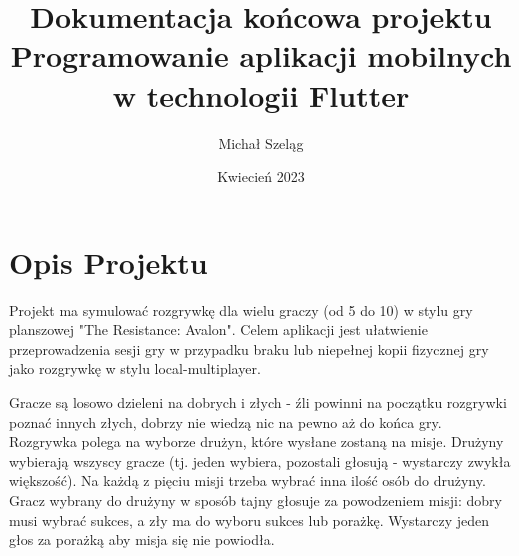 \documentclass[12pt]{article}
\title{Dokumentacja końcowa projektu \\
\large{Programowanie aplikacji mobilnych w technologii Flutter}}
\author{Michał Szeląg}
\date{Kwiecień 2023}
\begin{document}
\maketitle

\section{Opis Projektu}
Projekt ma symulować rozgrywkę dla wielu graczy (od 5 do 10) w stylu gry planszowej "The Resistance: Avalon". Celem aplikacji jest ułatwienie przeprowadzenia sesji gry w przypadku braku lub niepełnej kopii fizycznej gry jako rozgrywkę w stylu local-multiplayer. 

Gracze są losowo dzieleni na dobrych i złych - źli powinni na początku rozgrywki poznać innych złych, dobrzy nie wiedzą nic na pewno aż do końca gry.
Rozgrywka polega na wyborze drużyn, które wysłane zostaną na misje. Drużyny wybierają wszyscy gracze (tj. jeden wybiera, pozostali głosują - wystarczy zwykła większość). Na każdą z pięciu misji trzeba wybrać inna ilość osób do drużyny. Gracz wybrany do drużyny w sposób tajny głosuje za powodzeniem misji: dobry musi wybrać sukces, a zły ma do wyboru sukces lub porażkę. Wystarczy jeden głos za porażką aby misja się nie powiodła. 
\end{document}

